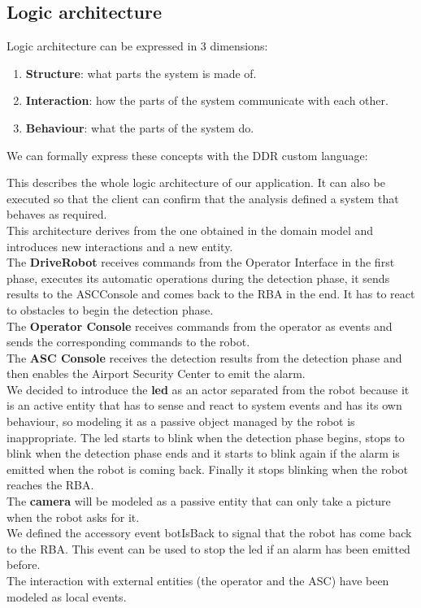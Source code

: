 \documentclass{llncs}
\begin{document}
\subsection{Logic architecture}
Logic architecture can be expressed in 3 dimensions:
\begin{enumerate}
\item \textbf{Structure}: what parts the system is made of.
\item \textbf{Interaction}: how the parts of the system communicate with each other.
\item \textbf{Behaviour}: what the parts of the system do.
\end{enumerate}
We can formally express these concepts with the DDR custom language:

This describes the whole logic architecture of our application. It can also be executed so that the client can confirm that the analysis defined a system that behaves as required.\\
This architecture derives from the one obtained in the domain model and introduces new interactions and a new entity.\\
The \textbf{DriveRobot} receives commands from the Operator Interface in the first phase, executes its automatic operations during the detection phase, it sends results to the ASCConsole and comes back to the RBA in the end. It has to react to obstacles to begin the detection phase.\\
The \textbf{Operator Console} receives commands from the operator as events and sends the corresponding commands to the robot.\\
The \textbf{ASC Console} receives the detection results from the detection phase and then enables the Airport Security Center to emit the alarm.\\
We decided to introduce the \textbf{led} as an actor separated from the robot because it is an active entity that has to sense and react to system events and has its own behaviour, so modeling it as a passive object managed by the robot is inappropriate. The led starts to blink when the detection phase begins, stops to blink when the detection phase ends and it starts to blink again if the alarm is emitted when the robot is coming back. Finally it stops blinking when the robot reaches the RBA.\\
The \textbf{camera} will be modeled as a passive entity that can only take a picture when the robot asks for it.\\
We defined the accessory event botIsBack to signal that the robot has come back to the RBA. This event can be used to stop the led if an alarm has been emitted before.\\
The interaction with external entities (the operator and the ASC) have been modeled as local events.
\end{document}
